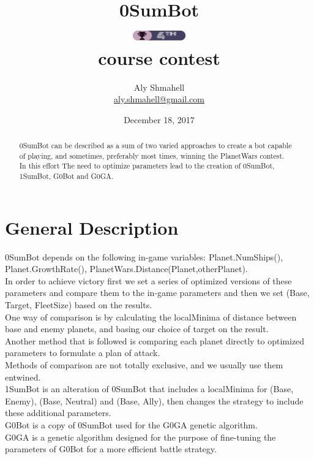 \documentclass[12pt]{report}
\begin{document}
	\title{%
		0SumBot\\[1ex]
		\includegraphics[width=64pt,height=12pt]{badge.png}\\
		\tiny{course contest}
	}
	\author{Aly Shmahell\\%
		\href{aly.shmahell@gmail.com}{aly.shmahell@gmail.com}
	}
	\date{December 18, 2017}
	
	\maketitle
	\begin{abstract}
		0SumBot can be described as a sum of two varied approaches to create a bot capable of playing, and sometimes, preferably most times, winning the PlanetWars contest.\\
		In this effort The need to optimize parameters lead to the creation of 0SumBot, 1SumBot, G0Bot and G0GA.
			\end{abstract}

	\section{\textbf{General Description}}
		0SumBot depends on the following in-game variables: Planet.NumShips(), Planet.GrowthRate(), PlanetWars.Distance(Planet,otherPlanet).\\
		In order to achieve victory first we set a series of optimized versions of these parameters and compare them to the in-game parameters and then we set (Base, Target, FleetSize) based on the results.\\
		One way of comparison is by calculating the localMinima of distance between base and enemy planets, and basing our choice of target on the result.\\
		Another method that is followed is comparing each planet directly to optimized parameters to formulate a plan of attack.\\
		Methods of comparison are not totally exclusive, and we usually use them entwined.\\
		1SumBot is an alteration of 0SumBot that includes a localMinima for (Base, Enemy), (Base, Neutral) and (Base, Ally), then changes the strategy to include these additional parameters.\\
		G0Bot is a copy of 0SumBot used for the G0GA genetic algorithm.\\
		G0GA is a genetic algorithm designed for the purpose of fine-tuning the parameters of G0Bot for a more efficient battle strategy.
\end{document}
